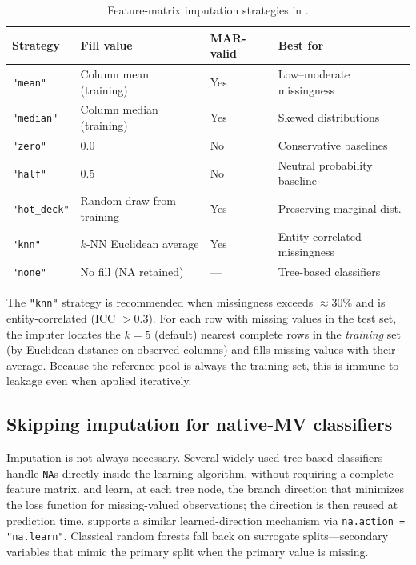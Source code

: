 \documentclass[a4paper]{article}
\begin{document}
\begin{article}
\begin{table}[ht]
\centering
\caption{Feature-matrix imputation strategies in .}
\label{tab:impute}
\smallskip
\begin{tabular}{lp{4.2cm}lp{2.5cm}}
\toprule
\textbf{Strategy} & \textbf{Fill value} & \textbf{MAR-valid}
  & \textbf{Best for} \\
\midrule
\texttt{"mean"}      & Column mean (training)  & Yes & Low--moderate missingness \\
\texttt{"median"}    & Column median (training) & Yes & Skewed distributions \\
\texttt{"zero"}      & 0.0                     & No  & Conservative baselines \\
\texttt{"half"}      & 0.5                     & No  & Neutral probability baseline \\
\texttt{"hot\_deck"} & Random draw from training & Yes & Preserving marginal dist. \\
\texttt{"knn"}       & $k$-NN Euclidean average & Yes & Entity-correlated missingness \\
\texttt{"none"}      & No fill (NA retained)   & ---  & Tree-based classifiers \\
\bottomrule
\end{tabular}
\end{table}

The \texttt{"knn"} strategy is recommended when missingness exceeds
$\approx 30\%$ and is entity-correlated (ICC $> 0.3$). For each row
with missing values in the test set, the imputer locates the $k = 5$
(default) nearest complete rows in the \emph{training} set (by
Euclidean distance on observed columns) and fills missing values with
their average.  Because the reference pool is always the training set,
this is immune to leakage even when applied iteratively.

\subsection{Skipping imputation for native-MV classifiers}
\label{sec:impute:native}

Imputation is not always necessary.  Several widely used tree-based
classifiers handle \texttt{NA}s directly inside the learning algorithm,
without requiring a complete feature matrix.
 \citep{ChenGuestrin2016} and 
\citep{Ke2017} learn, at each tree node, the branch direction that
minimizes the loss function for missing-valued observations; the
direction is then reused at prediction time.
 \citep{WrightZiegler2017} supports a similar
learned-direction mechanism via \texttt{na.action = "na.learn"}.
Classical random forests \citep{Breiman1984} fall back on
surrogate splits---secondary variables that mimic the primary split
when the primary value is missing.


\end{article}
\end{document}
